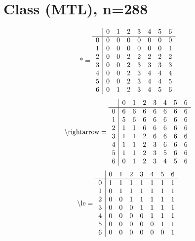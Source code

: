 \documentclass[11pt]{article}
\begin{document}
\section{Class (MTL), n=288}
\[\text{*} = 
\begin{array}{r | r r r r r r r}
 & 0 & 1 & 2 & 3 & 4 & 5 & 6 \\ \hline
0 & 0 & 0 & 0 & 0 & 0 & 0 & 0 \\
1 & 0 & 0 & 0 & 0 & 0 & 0 & 1 \\
2 & 0 & 0 & 2 & 2 & 2 & 2 & 2 \\
3 & 0 & 0 & 2 & 3 & 3 & 3 & 3 \\
4 & 0 & 0 & 2 & 3 & 4 & 4 & 4 \\
5 & 0 & 0 & 2 & 3 & 4 & 4 & 5 \\
6 & 0 & 1 & 2 & 3 & 4 & 5 & 6 \\
\end{array}
\]
\[\text{\textbackslash rightarrow} = 
\begin{array}{r | r r r r r r r}
 & 0 & 1 & 2 & 3 & 4 & 5 & 6 \\ \hline
0 & 6 & 6 & 6 & 6 & 6 & 6 & 6 \\
1 & 5 & 6 & 6 & 6 & 6 & 6 & 6 \\
2 & 1 & 1 & 6 & 6 & 6 & 6 & 6 \\
3 & 1 & 1 & 2 & 6 & 6 & 6 & 6 \\
4 & 1 & 1 & 2 & 3 & 6 & 6 & 6 \\
5 & 1 & 1 & 2 & 3 & 5 & 6 & 6 \\
6 & 0 & 1 & 2 & 3 & 4 & 5 & 6 \\
\end{array}
\]
\[\text{\textbackslash le} = 
\begin{array}{r | r r r r r r r}
 & 0 & 1 & 2 & 3 & 4 & 5 & 6 \\ \hline
0 & 1 & 1 & 1 & 1 & 1 & 1 & 1 \\
1 & 0 & 1 & 1 & 1 & 1 & 1 & 1 \\
2 & 0 & 0 & 1 & 1 & 1 & 1 & 1 \\
3 & 0 & 0 & 0 & 1 & 1 & 1 & 1 \\
4 & 0 & 0 & 0 & 0 & 1 & 1 & 1 \\
5 & 0 & 0 & 0 & 0 & 0 & 1 & 1 \\
6 & 0 & 0 & 0 & 0 & 0 & 0 & 1 \\
\end{array}
\]
\end{document}
